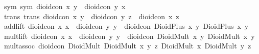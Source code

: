 \begin{isabellebody}
{}\ sym\ {}sym{}{}\ {}dioid{}con\ x\ y\ {}\ dioid{}con\ y\ x{}\isanewline
{}\ trans\ {}trans{}{}\ {}dioid{}con\ x\ y\ {}\ dioid{}con\ y\ z\ {}\ dioid{}con\ x\ z{}\isanewline
{}\ add{}lift{}\ {}dioid{}con\ x{}\ x{}\ {}\ dioid{}con\ y{}\ y{}\ {}\ dioid{}con\ {}DioidPlus\ x{}\ y{}{}\ {}DioidPlus\ x{}\ y{}{}{}\isanewline
{}\ mult{}lift{}\ {}dioid{}con\ x{}\ x{}\ {}\ dioid{}con\ y{}\ y{}\ {}\ dioid{}con\ {}DioidMult\ x{}\ y{}{}\ {}DioidMult\ x{}\ y{}{}{}\isanewline
{}\ mult{}assoc{}\ {}dioid{}con\ {}DioidMult\ {}DioidMult\ x\ y{}\ z{}\ {}DioidMult\ x\ {}DioidMult\ y\ z{}{}{}\isanewline

\end{isabellebody}
